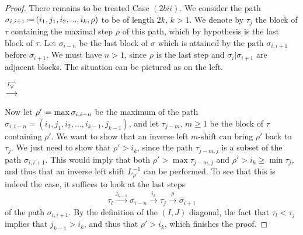 \documentclass{amsart}
\theoremstyle{definition}
\newcommand{\eqdef}{\mbox{\,\raisebox{0.2ex}{\scriptsize\ensuremath{\mathrm:}}\ensuremath{=}\,}} %
\begin{document}
\begin{proof}
There remains to be treated Case $(2bii)$.
We consider the path $\sigma_{i,i+1} \eqdef (i_1,j_1,i_2,...,i_{k},\rho)$ to be of length $2k$, $k>1$. 
We denote by $\tau_j$ the block of $\tau$ containing the maximal step $\rho$ of this path, which by hypothesis is the last block of $\tau$. 
Let $\sigma_{i-n}$ be the last block of $\sigma$ which is attained by the path $\sigma_{i,i+1}$ before $\sigma_{i+1}$. 
We must have $n>1$, since $\rho$ is the last step and $\sigma_i|\sigma_{i+1}$ are adjacent blocks.
The situation can be pictured as on the left.
\begin{center}
$\xrightarrow{L_{\rho'}^{-1}}$
\end{center}
Now let $\rho' \eqdef \max\sigma_{i,i-n}$ be the maximum of the path $\sigma_{i,i-n}=(i_1,j_1,i_2,...,i_{k-1},j_{k-1})$, and let $\tau_{j-m}$, $m\geq 1$ be the block of $\tau$ containing $\rho'$.
We want to show that an inverse left $m$-shift can bring $\rho'$ back to $\tau_j$.  
We just need to show that $\rho' > i_k$, since the path $\tau_{j-m,j}$ is a subset of the path $\sigma_{i,i+1}$. 
This would imply that both $\rho' > \max \tau_{j-m,j}$ and $\rho' > i_k \geq \min \tau_j$, and thus that an inverse left shift $L_{\rho'}^{-1}$ can be performed.
To see that this is indeed the case, it suffices to look at the last steps $$\tau_l \overset{j_{k-1}}{\longrightarrow} \sigma_{i-n} \overset{i_{k}}{\longrightarrow} \tau_j \overset{\rho}{\longrightarrow} \sigma_{i+1}$$ of the path $\sigma_{i,i+1}$. 
By the definition of the $(I,J)$ diagonal, the fact that $\tau_l < \tau_j$ implies that $j_{k-1} > i_k$, and thus that $\rho' > i_k$, which finishes the proof. 
\end{proof}
\end{document}
